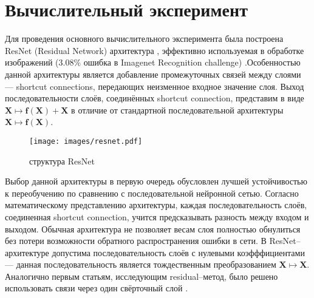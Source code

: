 \documentclass[12pt,twosides]{article}
\begin{document}
	\section{Вычислительный эксперимент}
	
	Для проведения основного вычислительного эксперимента была построена ResNet (Residual Network) архитектура \cite{DBLP:journals/corr/HeZRS15}, эффективно используемая в обработке изображений ($3.08\%$ ошибка в Imagenet Recognition challenge) \cite{DBLP:journals/corr/ZagoruykoK16}.Особенностью данной архитектуры является добавление промежуточных связей между слоями --- shortcut connections, передающих неизменное входное значение слоя. Выход последовательности слоёв, соединённых shortcut connection, представим в виде $\mathbf{X}\mapsto\mathbf{f(X)+X}$ в отличие от стандартной последовательной архитектуры $\mathbf{X}\mapsto\mathbf{f(X)}$.
	
	\begin{figure}[h!]
		\centering
		\texttt{[image: images/resnet.pdf]}
		\caption{структура ResNet}
	\end{figure}

	Выбор данной архитектуры в первую очередь обусловлен лучшей устойчивостью к переобучению по сравнению с последовательной нейронной сетью. Согласно математическому представлению архитектуры, каждая последовательность слоёв, соединенная shortcut connection, учится предсказывать разность между входом и выходом. Обычная архитектура не позволяет весам слоя полностью обнулиться без потери возможности обратного распространения ошибки в сети. В ResNet--архитектуре допустима последовательность слоёв с нулевыми коэфффициентами --- данная последовательность является тождественным преобразованием $\mathbf{X}\mapsto\mathbf{X}$. 
	Аналогично первым статьям, исследующим residual--метод, было решено использовать связи через один свёрточный слой \cite{DBLP:journals/corr/HeZRS15, DBLP:journals/corr/VeitWB16}.


	
	
	
\end{document}
